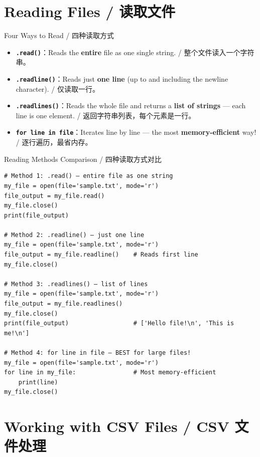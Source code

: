\documentclass[11pt,a4paper]{report}
\let\oldtexttt\texttt
\renewcommand{\texttt}[1]{\textcolor{mainblue}{\oldtexttt{#1}}}
\begin{document}
\section{Reading Files / 读取文件}

\begin{concept}{Four Ways to Read / 四种读取方式}
    \begin{itemize}[itemsep=0.8em]
        \item \textbf{\texttt{.read()}}：Reads the \textbf{entire} file as one single string. / 整个文件读入一个字符串。
        \item \textbf{\texttt{.readline()}}：Reads just \textbf{one line} (up to and including the newline character). / 仅读取一行。
        \item \textbf{\texttt{.readlines()}}：Reads the whole file and returns a \textbf{list of strings} — each line is one element. / 返回字符串列表，每个元素是一行。
        \item \textbf{\texttt{for line in file}}：Iterates line by line — the most \textbf{memory-efficient} way! / 逐行遍历，最省内存。
    \end{itemize}
\end{concept}

\begin{examplebox}{Reading Methods Comparison / 四种读取方式对比}
\begin{lstlisting}
# Method 1: .read() — entire file as one string
my_file = open(file='sample.txt', mode='r')
file_output = my_file.read()
my_file.close()
print(file_output)

# Method 2: .readline() — just one line
my_file = open(file='sample.txt', mode='r')
file_output = my_file.readline()    # Reads first line
my_file.close()

# Method 3: .readlines() — list of lines
my_file = open(file='sample.txt', mode='r')
file_output = my_file.readlines()
my_file.close()
print(file_output)                  # ['Hello file!\n', 'This is me!\n']

# Method 4: for line in file — BEST for large files!
my_file = open(file='sample.txt', mode='r')
for line in my_file:                # Most memory-efficient
    print(line)
my_file.close()
\end{lstlisting}
\end{examplebox}

\section{Working with CSV Files / CSV 文件处理}
\end{document}
